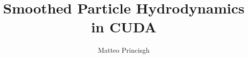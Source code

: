 \documentclass{article}
\title{\textbf{Smoothed Particle Hydrodynamics in CUDA}}
\begin{document}
\author{Matteo Princisgh}
\date{}
\maketitle







\newpage


\end{document}
